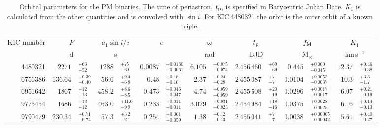\documentclass[a4paper,fleqn,usenatbib]{mnras}
\begin{document}
\begin{table*}
\centering
\caption{Orbital parameters for the PM binaries. The time of periastron, $t_{\rm p}$, is specified in Barycentric Julian Date. $K_1$ is calculated from the other quantities and is convolved with $\sin i$. For KIC\,4480321 the orbit is the outer orbit of a known triple.}
\label{tab:appendix_c_orbits}
\begin{tabular}{r r@{}l r@{}l r@{}l r@{}l r@{}l r@{}l r@{}l}
\toprule
\multicolumn{1}{c}{KIC number} & \multicolumn{2}{c}{$P$} & \multicolumn{2}{c}{$a_1 \sin i / c$} & \multicolumn{2}{c}{$e$} & \multicolumn{2}{c}{$\varpi$} & \multicolumn{2}{c}{$t_{\rm p}$} & \multicolumn{2}{c}{$f_{\rm M}$} & \multicolumn{2}{c}{$K_1$}\\
\multicolumn{1}{c}{} & \multicolumn{2}{c}{d} & \multicolumn{2}{c}{s} & \multicolumn{2}{c}{} & \multicolumn{2}{c}{rad} & \multicolumn{2}{c}{BJD} & \multicolumn{2}{c}{M$_{\odot}$} & \multicolumn{2}{c}{km\,s$^{-1}$}\\
\midrule
\vspace{1.5mm}
4480321 & $2271$&$^{+63}_{-52}$ & $1288$&$^{+75}_{-60}$ & $0.0087$&$^{+0.0130}_{-0.0061}$ & $6.105$&$^{+0.075}_{-0.074}$ & $2\,456\,460$&$^{+69}_{-69}$ & $0.445$&$^{+0.060}_{-0.045}$ & $12.37$&$^{+0.46}_{-0.38}$\\
\vspace{1.5mm}
6756386 & $136.64$&$^{+0.39}_{-0.40}$ & $56.6$&$^{+9.4}_{-6.8}$ & $0.48$&$^{+0.18}_{-0.16}$ & $2.37$&$^{+0.24}_{-0.28}$ & $2\,455\,087$&$^{+7}_{-7}$ & $0.0104$&$^{+0.0052}_{-0.0037}$ & $10.3$&$^{+3.3}_{-1.7}$\\
\vspace{1.5mm}
6951642 & $1867$&$^{+12}_{-13}$ & $458.2$&$^{+8.6}_{-8.5}$ & $0.473$&$^{+0.046}_{-0.047}$ & $4.74$&$^{+0.059}_{-0.059}$ & $2\,455\,608$&$^{+20}_{-19}$ & $0.0296$&$^{+0.0017}_{-0.0017}$ & $6.07$&$^{+0.21}_{-0.19}$\\
\vspace{1.5mm}
9775454 & $1686$&$^{+13}_{-12}$ & $463.0$&$^{+11.0}_{-9.9}$ & $0.233$&$^{+0.011}_{-0.011}$ & $3.029$&$^{+0.031}_{-0.023}$ & $2\,454\,984$&$^{+18}_{-16}$ & $0.0375$&$^{+0.0028}_{-0.0025}$ & $6.16$&$^{+0.14}_{-0.13}$\\
\vspace{1.5mm}
9790479 & $230.34$&$^{+0.71}_{-0.74}$ & $57.3$&$^{+3.2}_{-2.1}$ & $0.254$&$^{+0.061}_{-0.059}$ & $1.38$&$^{+0.12}_{-0.13}$ & $2\,455\,041$&$^{+7}_{-7}$ & $0.0038$&$^{+0.00065}_{-0.00042}$ & $5.61$&$^{+0.40}_{-0.27}$\\
\bottomrule
\end{tabular}
\end{table*}
\end{document}
